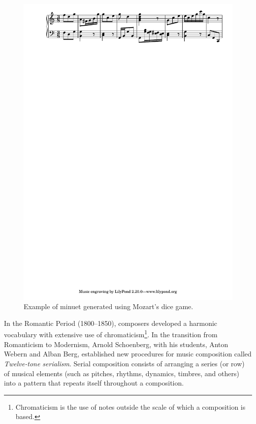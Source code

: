 \begin{figure}[!h]
 \centering
 \includegraphics[width=\columnwidth]{imgs/background/mozart_dice.pdf}
 \caption{Example of minuet generated using Mozart's dice game.}
 \label{fig:mozart_dice}
\end{figure}

In the Romantic Period (1800--1850), composers developed a harmonic vocabulary with extensive use of chromaticism\footnote{Chromaticism is the use of notes outside the scale of which a composition is based.}. In the transition from Romanticism to Modernism, Arnold Schoenberg, with his students, Anton Webern and Alban Berg, established new procedures for music composition called \textit{Twelve-tone serialism}. Serial composition consists of arranging a series (or row) of musical elements (such as pitches, rhythms, dynamics, timbres, and others) into a pattern that repeats itself throughout a composition.

